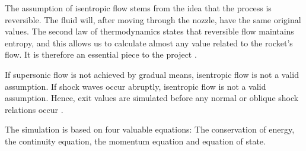 	The assumption of isentropic flow stems from the idea that the process is reversible. The fluid will, after moving through the nozzle, have the same original values. The second law of thermodynamics states that reversible flow maintains entropy, and this allows us to calculate almost any value related to the rocket's flow. It is therefore an essential piece to the project \cite{nakkanozz}.

	If supersonic flow is not achieved by gradual means, isentropic flow is not a valid assumption. If shock waves occur abruptly, isentropic flow is not a valid assumption. Hence, exit values are simulated before any normal or oblique shock relations occur \cite{nasaisentrop}.

	The simulation is based on four valuable equations: The conservation of energy, the continuity equation, the momentum equation and equation of state.

